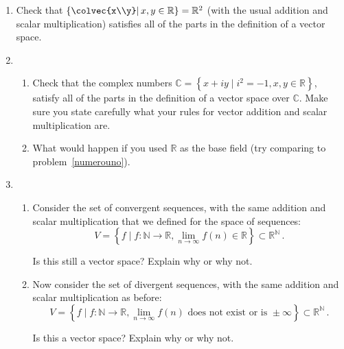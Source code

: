


\begin{enumerate}
\item \label{numerouno} Check that $\left\{\colvec{x\\y} \middle|\,  x,y \in \mathbb{R} \right\} = \mathbb{R}^2$ (with the usual addition and scalar multiplication) satisfies all of the parts in the definition of a vector space.

\vspace{5mm}

\item 
\begin{enumerate}
\item Check that the complex numbers $\mathbb{C}= \left\{x+iy \mid i^2=-1, x,y\in \mathbb{R} \right\}$, satisfy all of the parts in the definition of a vector space over  ${\mathbb C}$.
Make sure you state carefully what your rules for vector addition and scalar multiplication are. \\
\item What would happen if you used ${\mathbb R}$ as the base field (try comparing to problem~\ref{numerouno}).
\end{enumerate}
\vspace{5mm}

\item \begin{enumerate}
\item Consider the set of convergent sequences, with the same addition and scalar multiplication that we defined for the space of sequences: 
\[V = \left\{f \mid f \colon \mathbb{N} \rightarrow \mathbb{R}, \lim_{n \rightarrow \infty} f(n) \in \mathbb{R} \right\}\subset {\mathbb R}^{\mathbb N}\, .\]

Is this still a vector space?  Explain why or why not.

\item Now consider the set of divergent sequences, with the same addition and scalar multiplication as before:
\[V = \left\{f \mid f \colon \mathbb{N} \rightarrow \mathbb{R}, \lim_{n \rightarrow \infty} f (n)\text{ does not exist or is }\pm \infty \right\}\subset {\mathbb R}^{\mathbb N}\, .\]

Is this a vector space? Explain why or why not.
\end{enumerate}



\end{enumerate}
